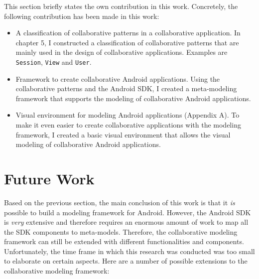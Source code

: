 This section briefly states the own contribution in this work. Concretely, the following contribution has been made in this work:
\begin{itemize}
\item{A classification of collaborative patterns in a collaborative application. In chapter 5, I constructed a classification of collaborative patterns that are mainly used in the design of collaborative applications. Examples are \texttt{Session}, \texttt{View} and \texttt{User}.}
\item{Framework to create collaborative Android applications. Using the collaborative patterns and the Android SDK, I created a meta-modeling framework that supports the modeling of collaborative Android applications.}
\item{Visual environment for modeling Android applications (Appendix A). To make it even easier to create collaborative applications with the modeling framework, I created a basic visual environment that allows the visual modeling of collaborative Android applications.}
\end{itemize}

\section{Future Work}

Based on the previous section, the main conclusion of this work is that it \textit{is} possible to build a modeling framework for Android. However, the Android SDK is \textit{very} extensive and therefore requires an enormous amount of work to map all the SDK components to meta-models. Therefore, the collaborative modeling framework can still be extended with different functionalities and components. Unfortunately, the time frame in which this research was conducted was too small to elaborate on certain aspects. Here are a number of possible extensions to the collaborative modeling framework:

